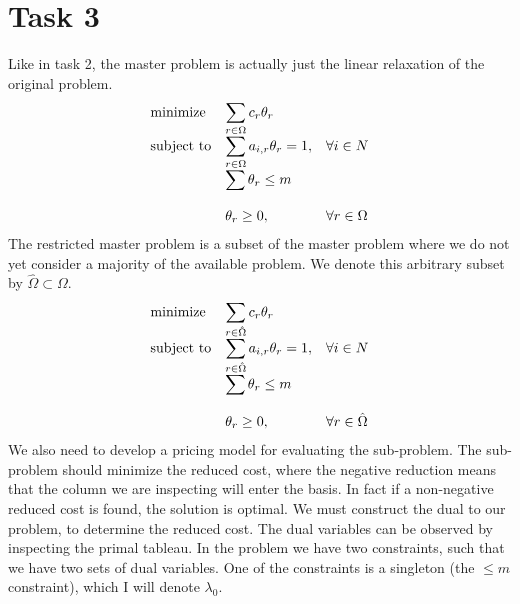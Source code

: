 \documentclass{article}
\begin{document}
    \section{Task 3}
    Like in task 2, the master problem is actually just the linear relaxation of the original problem.
    \begin{equation*}
        \begin{array}{ll@{}ll}
            \text{minimize}  & \displaystyle\sum_{r \in \Omega} c_r \theta_r& &\\
            \text{subject to}& \displaystyle\sum_{r \in \Omega} a_{i, r} \theta_r = 1 ,&   &\forall i \in N\\
            & \displaystyle\sum \theta_r \leq m &&\\\\
            & \displaystyle \theta_r  \geq 0,  && \forall r \in \Omega
        \end{array}
    \end{equation*}
    The restricted master problem is a subset of the master problem where we do not yet consider a majority of the available problem.
    We denote this arbitrary subset by $\hat{\Omega} \subset \Omega$.
    \begin{equation*}
        \begin{array}{ll@{}ll}
            \text{minimize}  & \displaystyle\sum_{r \in \hat{\Omega}} c_r \theta_r& &\\
            \text{subject to}& \displaystyle\sum_{r \in \hat{\Omega}} a_{i, r} \theta_r = 1 ,&   &\forall i \in N\\
            & \displaystyle\sum \theta_r \leq m &&\\\\
            & \displaystyle \theta_r  \geq 0,  && \forall r \in \hat{\Omega}
        \end{array}
    \end{equation*}
    We also need to develop a pricing model for evaluating the sub-problem.
    The sub-problem should minimize the reduced cost, where the negative reduction means that the column we are inspecting will enter the basis.
    In fact if a non-negative reduced cost is found, the solution is optimal.
    We must construct the dual to our problem, to determine the reduced cost.
    The dual variables can be observed by inspecting the primal tableau.
    In the problem we have two constraints, such that we have two sets of dual variables.
    One of the constraints is a singleton (the $\leq m$ constraint), which I will denote $\lambda_0$.
\end{document}
